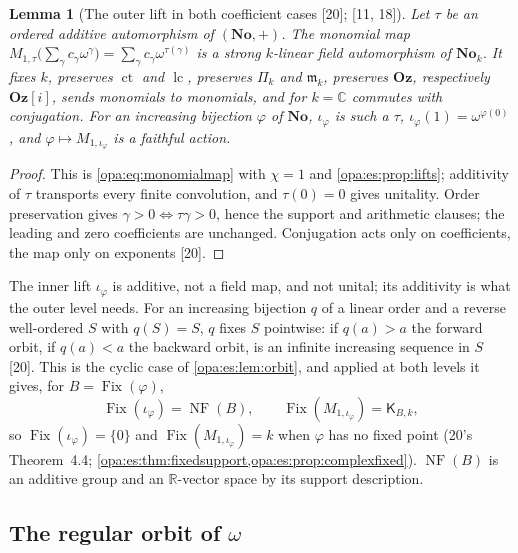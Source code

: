\documentclass[11pt,oneside]{article}
\numberwithin{equation}{section}
\newtheorem{lemma}[lemma]{Lemma}
\theoremstyle{definition}
\theoremstyle{remark}
\newcommand{\No}{\mathbf{No}}
\newcommand{\Oz}{\mathbf{Oz}}
\newcommand{\Og}{\mathbf{Oz}[i]}
\newcommand{\R}{\mathbb R}
\newcommand{\C}{\mathbb C}
\newcommand{\mm}{\mathfrak m}
\newcommand{\lc}{\operatorname{lc}}
\newcommand{\ct}{\operatorname{ct}}
\newcommand{\Fix}{\operatorname{Fix}}
\newcommand{\src}[1]{\textup{\textsf{\small[#1]}}}
\newcommand{\NF}{\operatorname{NF}}
\begin{document}
\begin{lemma}[The outer lift in both coefficient cases \src{20}; \src{11, 18}]\label{opa:us:lem:outer}
Let $\tau$ be an ordered additive automorphism of $(\No,+)$. The monomial map $M_{1,\tau}\bigl(\sum_\gamma c_\gamma\omega^\gamma\bigr)=\sum_\gamma
c_\gamma\omega^{\tau(\gamma)}$ is a strong $k$-linear field automorphism of $\No_k$. It fixes $k$, preserves $\ct$ and $\lc$, preserves
$\Pi_k$ and $\mm_k$, preserves $\Oz$, respectively $\Og$, sends monomials to monomials, and for $k=\C$ commutes with conjugation. For an
increasing bijection $\varphi$ of $\No$, $\iota_\varphi$ is such a $\tau$, $\iota_\varphi(1)=\omega^{\varphi(0)}$, and $\varphi\mapsto M_{1,\iota_\varphi}$
is a faithful action.
\end{lemma}
\begin{proof}
This is \eqref{opa:eq:monomialmap} with $\chi=1$ and \cref{opa:es:prop:lifts}; additivity of $\tau$ transports every finite convolution, and
$\tau(0)=0$ gives unitality. Order preservation gives $\gamma>0\Leftrightarrow\tau\gamma>0$, hence the support and arithmetic clauses; the
leading and zero coefficients are unchanged. Conjugation acts only on coefficients, the map only on exponents \src{20}.
\end{proof}

The inner lift $\iota_\varphi$ is additive, not a field map, and not unital; its additivity is what the outer level needs. For an increasing
bijection $q$ of a linear order and a reverse well-ordered $S$ with $q(S)=S$, $q$ fixes $S$ pointwise: if $q(a)>a$ the forward orbit, if
$q(a)<a$ the backward orbit, is an infinite increasing sequence in $S$ \src{20}. This is the cyclic case of \cref{opa:es:lem:orbit}, and
applied at both levels it gives, for $B=\Fix(\varphi)$,
\begin{equation}\label{opa:us:eq:fixedfields}
 \Fix(\iota_\varphi)=\NF(B),\qquad \Fix(M_{1,\iota_\varphi})=\mathsf K_{B,k},
\end{equation}
so $\Fix(\iota_\varphi)=\{0\}$ and $\Fix(M_{1,\iota_\varphi})=k$ when $\varphi$ has no fixed point (20's Theorem~4.4;
\cref{opa:es:thm:fixedsupport,opa:es:prop:complexfixed}). $\NF(B)$ is an additive group and an $\R$-vector space by its support description.

\subsection{The regular orbit of \texorpdfstring{$\omega$}{omega}}
\end{document}
